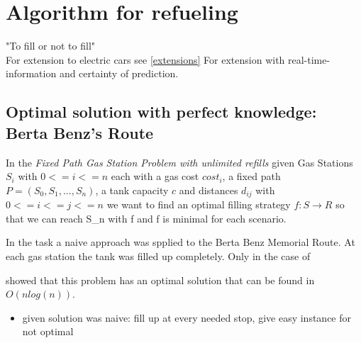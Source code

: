 \documentclass[%
a4paper,
DIV12,
2.5headlines,
bigheadings,
titlepage,
openbib,
]{scrartcl}
\begin{document}
\section{Algorithm for refueling}
"To fill or not to fill"\cite{khuller2007fill}\\
For extension to electric cars see \ref{extensions}
For extension with real-time-information and certainty of prediction.

\subsection{Optimal solution with perfect knowledge: Berta Benz's Route}

In the \textit{Fixed Path Gas Station Problem with unlimited refills} given Gas Stations $S_i$ with $0 <= i <= n$ each with a gas cost $cost_i$, a fixed path $P = (S_0,S_1, ..., S_n)$, a tank capacity $c$ and distances $d_{ij}$ with $0 <= i <= j <= n$ we want to find an optimal filling strategy $f: S \rightarrow R$ so that we can reach S_n with f and f is minimal for each scenario.

In the task a naive approach was spplied to the Berta Benz Memorial Route.
At each gas station the tank was filled up completely.
Only in the case of 

\cite{khuller2007fill} showed that this problem has an optimal solution that can be found in $O(n log(n))$.



\begin{itemize}
\item given solution was naive: fill up at every needed stop, give easy instance for not optimal
\end{itemize}
\end{document}
